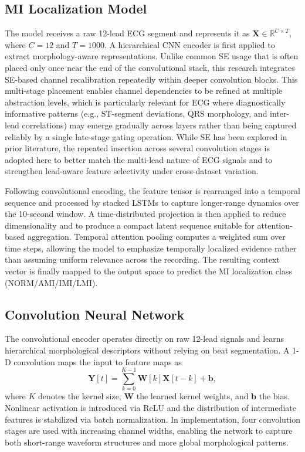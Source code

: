 \documentclass[preprint,12pt]{elsarticle}
\begin{document}
\subsection{MI Localization Model}
The model receives a raw 12-lead ECG segment and represents it as $\mathbf{X}\in\mathbb{R}^{C\times T}$, where $C=12$ and $T=1000$. A hierarchical CNN encoder is first applied to extract morphology-aware representations. Unlike common SE usage that is often placed only once near the end of the convolutional stack, this research integrates SE-based channel recalibration repeatedly within deeper convolution blocks. This multi-stage placement enables channel dependencies to be refined at multiple abstraction levels, which is particularly relevant for ECG where diagnostically informative patterns (e.g., ST-segment deviations, QRS morphology, and inter-lead correlations) may emerge gradually across layers rather than being captured reliably by a single late-stage gating operation. While SE has been explored in prior literature, the repeated insertion across several convolution stages is adopted here to better match the multi-lead nature of ECG signals and to strengthen lead-aware feature selectivity under cross-dataset variation.

Following convolutional encoding, the feature tensor is rearranged into a temporal sequence and processed by stacked LSTMs to capture longer-range dynamics over the 10-second window. A time-distributed projection is then applied to reduce dimensionality and to produce a compact latent sequence suitable for attention-based aggregation. Temporal attention pooling computes a weighted sum over time steps, allowing the model to emphasize temporally localized evidence rather than assuming uniform relevance across the recording. The resulting context vector is finally mapped to the output space to predict the MI localization class (NORM/AMI/IMI/LMI).



\subsection{Convolution Neural Network}
The convolutional encoder operates directly on raw 12-lead signals and learns hierarchical morphological descriptors without relying on beat segmentation. A 1-D convolution maps the input to feature maps as
\begin{equation}
\mathbf{Y}[t] = \sum_{k=0}^{K-1} \mathbf{W}[k]\mathbf{X}[t-k] + \mathbf{b},
\label{eq:conv1d}
\end{equation}
where $K$ denotes the kernel size, $\mathbf{W}$ the learned kernel weights, and $\mathbf{b}$ the bias. Nonlinear activation is introduced via ReLU and the distribution of intermediate features is stabilized via batch normalization. In implementation, four convolution stages are used with increasing channel widths, enabling the network to capture both short-range waveform structures and more global morphological patterns.
\end{document}
